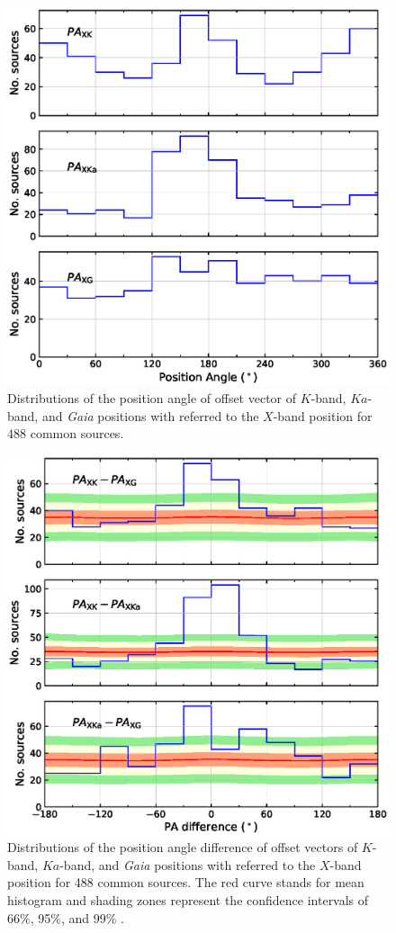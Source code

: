 \documentclass[referee]{aa}        %
\begin{document}

    \begin{figure}[hbtp]
        \centering
        \includegraphics[width=0.7\columnwidth]{figs/pa-hist}
        \caption[]{\label{fig:pa-hist}
            Distributions of the position angle of offset vector of $K$-band, $Ka$-band, and \textit{Gaia} positions with referred to the $X$-band position for 488 common sources.
        }
    \end{figure}


    \begin{figure}[hbtp]
        \centering
        \includegraphics[width=0.7\columnwidth]{figs/pa-diff}
        \caption[]{\label{fig:pa-diff}
            Distributions of the position angle difference of offset vectors of $K$-band, $Ka$-band, and \textit{Gaia} positions with referred to the $X$-band position for 488 common sources.
            The red curve stands for mean histogram and shading zones represent the confidence intervals of 66\%, 95\%, and 99\% .
        }
    \end{figure}
\end{document}

